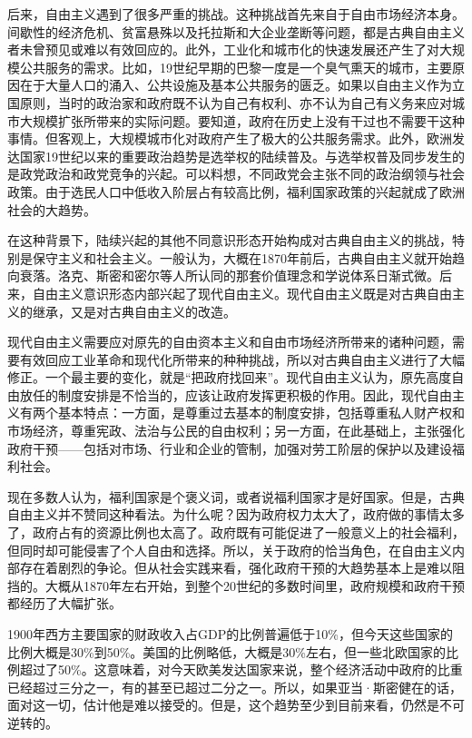 
后来，自由主义遇到了很多严重的挑战。这种挑战首先来自于自由市场经济本身。间歇性的经济危机、贫富悬殊以及托拉斯和大企业垄断等问题，都是古典自由主义者未曾预见或难以有效回应的。此外，工业化和城市化的快速发展还产生了对大规模公共服务的需求。比如，19世纪早期的巴黎一度是一个臭气熏天的城市，主要原因在于大量人口的涌入、公共设施及基本公共服务的匮乏。如果以自由主义作为立国原则，当时的政治家和政府既不认为自己有权利、亦不认为自己有义务来应对城市大规模扩张所带来的实际问题。要知道，政府在历史上没有干过也不需要干这种事情。但客观上，大规模城市化对政府产生了极大的公共服务需求。此外，欧洲发达国家19世纪以来的重要政治趋势是选举权的陆续普及。与选举权普及同步发生的是政党政治和政党竞争的兴起。可以料想，不同政党会主张不同的政治纲领与社会政策。由于选民人口中低收入阶层占有较高比例，福利国家政策的兴起就成了欧洲社会的大趋势。

在这种背景下，陆续兴起的其他不同意识形态开始构成对古典自由主义的挑战，特别是保守主义和社会主义。一般认为，大概在1870年前后，古典自由主义就开始趋向衰落。洛克、斯密和密尔等人所认同的那套价值理念和学说体系日渐式微。后来，自由主义意识形态内部兴起了现代自由主义。现代自由主义既是对古典自由主义的继承，又是对古典自由主义的改造。

现代自由主义需要应对原先的自由资本主义和自由市场经济所带来的诸种问题，需要有效回应工业革命和现代化所带来的种种挑战，所以对古典自由主义进行了大幅修正。一个最主要的变化，就是“把政府找回来”。现代自由主义认为，原先高度自由放任的制度安排是不恰当的，应该让政府发挥更积极的作用。因此，现代自由主义有两个基本特点：一方面，是尊重过去基本的制度安排，包括尊重私人财产权和市场经济，尊重宪政、法治与公民的自由权利；另一方面，在此基础上，主张强化政府干预——包括对市场、行业和企业的管制，加强对劳工阶层的保护以及建设福利社会。

现在多数人认为，福利国家是个褒义词，或者说福利国家才是好国家。但是，古典自由主义并不赞同这种看法。为什么呢？因为政府权力太大了，政府做的事情太多了，政府占有的资源比例也太高了。政府既有可能促进了一般意义上的社会福利，但同时却可能侵害了个人自由和选择。所以，关于政府的恰当角色，在自由主义内部存在着剧烈的争论。但从社会实践来看，强化政府干预的大趋势基本上是难以阻挡的。大概从1870年左右开始，到整个20世纪的多数时间里，政府规模和政府干预都经历了大幅扩张。

1900年西方主要国家的财政收入占GDP的比例普遍低于10\%，但今天这些国家的比例大概是30\%到50\%。美国的比例略低，大概是30\%左右，但一些北欧国家的比例超过了50\%。这意味着，对今天欧美发达国家来说，整个经济活动中政府的比重已经超过三分之一，有的甚至已超过二分之一。所以，如果亚当·斯密健在的话，面对这一切，估计他是难以接受的。但是，这个趋势至少到目前来看，仍然是不可逆转的。

